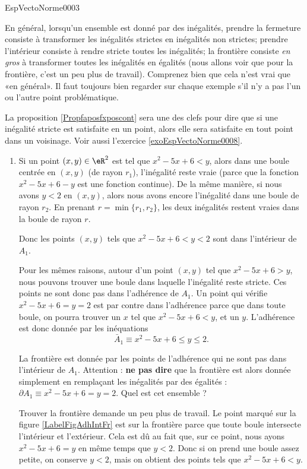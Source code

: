 \begin{corrige}{EspVectoNorme0003}

	En général, lorsqu'un ensemble est donné par des inégalités, prendre la fermeture
    consiste à transformer les inégalités strictes en inégalités non strictes; prendre
    l'intérieur consiste à rendre stricte toutes les inégalités; la frontière consiste
    \emph{en gros} à transformer toutes les inégalités en égalités (nous allons voir que
    pour la frontière, c'est un peu plus de travail). Comprenez bien que cela n'est vrai
    que «en général». Il faut toujours bien regarder sur chaque exemple s'il n'y a pas l'un ou l'autre point problématique.

	La proposition \ref{Propfaposfxposcont} sera une des clefs pour dire que si une inégalité stricte est satisfaite en un point, alors elle sera satisfaite en tout point dans un voisinage. Voir aussi l'exercice \ref{exoEspVectoNorme0008}.
	\begin{enumerate}
		\item
			Si un point $(x,y)\in\eR^2$ est tel que $x^2-5x+6<y$, alors dans une boule centrée en $(x,y)$ (de rayon $r_1$), l'inégalité reste vraie (parce que la fonction $x^2-5x+6-y$ est une fonction continue). De la même manière, si nous avons $y<2$ en $(x,y)$, alors nous avons encore l'inégalité dans une boule de rayon $r_2$. En prenant $r=\min\{ r_1,r_2 \}$, les deux inégalités restent vraies dans la boule de rayon $r$.

			Donc les points $(x,y)$ tels que $x^2 - 5x + 6 < y < 2$ sont dans l'intérieur de $A_1$.
			
			Pour les mêmes raisons, autour d'un point $(x,y)$ tel que $x^2-5x+6>y$, nous pouvons trouver une boule dans laquelle l'inégalité reste stricte. Ces points ne sont donc pas dans l'adhérence de $A_1$. Un point qui vérifie $x^2-5x+6= y= 2$ est par contre dans l'adhérence parce que dans toute boule, on pourra trouver un $x$ tel que $x^2-5x+6<y$, et un $y$. L'adhérence est donc donnée par les inéquations
			\begin{equation}
				\bar A_1\equiv x^2-5x+6\leq y\leq 2.
			\end{equation}
			
			La frontière est donnée par les points de l'adhérence qui ne sont pas dans l'intérieur de $A_1$. Attention : {\bf ne pas dire} que la frontière est alors donnée simplement en remplaçant les inégalités par des égalités : $\partial A_1\equiv x^2-5x+6= y= 2$. Quel est cet ensemble ?

			Trouver la frontière demande un peu plus de travail. Le point marqué sur la figure \ref{LabelFigAdhIntFr} est sur la frontière parce que toute boule intersecte l'intérieur et l'extérieur. Cela est dû au fait que, sur ce point, nous ayons $x^2-5x+6=y$ en même temps que $y<2$. Donc si on prend une boule assez petite, on conserve $y<2$, mais on obtient des points tels que $x^2-5x+6<y$. 


\end{enumerate}
\end{corrige}
